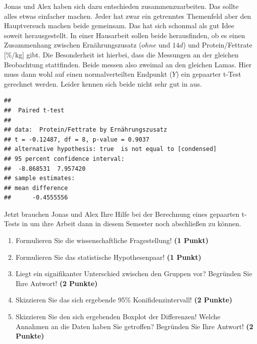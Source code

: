 \documentclass[a4paper, 9pt]{scrartcl}\usepackage[]{graphicx}\usepackage[]{xcolor}
\makeatletter
\newenvironment{kframe}{%
 \def\at@end@of@kframe{}%
 \ifinner\ifhmode%
  \def\at@end@of@kframe{\end{minipage}}%
  \begin{minipage}{\columnwidth}%
 \fi\fi%
 \def\FrameCommand##1{\hskip\@totalleftmargin \hskip-\fboxsep
 \colorbox{shadecolor}{##1}\hskip-\fboxsep
     \hskip-\linewidth \hskip-\@totalleftmargin \hskip\columnwidth}%
 \MakeFramed {\advance\hsize-\width
   \@totalleftmargin\z@ \linewidth\hsize
   \@setminipage}}%
 {\par\unskip\endMakeFramed%
 \at@end@of@kframe}
\newenvironment{knitrout}{}{} %
\makeatother
\begin{document}
Jonas und Alex haben sich dazu entschieden zusammenzuarbeiten. Das sollte alles etwas einfacher machen. Jeder hat zwar ein getrenntes Themenfeld aber den Hauptversuch machen beide gemeinsam. Das hat sich schonmal als gut Idee soweit herausgestellt. In einer Hausarbeit sollen beide herausfinden, ob es einen Zusammenhang zwischen Ernährungszusatz ($ohne$ und $14d$) und Protein/Fettrate [\%/kg] gibt. Die Besonderheit ist hierbei, dass die Messungen an der gleichen Beobachtung stattfinden. Beide messen also zweimal an den gleichen Lamas. Hier muss dann wohl auf einen normalverteilten Endpunkt ($Y$) ein gepaarter t-Test gerechnet werden. Leider kennen sich beide nicht sehr gut in \Rlogo aus.

\begin{knitrout}
\color{fgcolor}\begin{kframe}
\begin{verbatim}
## 
## 	Paired t-test
## 
## data:  Protein/Fettrate by Ernährungszusatz
## t = -0.12487, df = 8, p-value = 0.9037
## alternative hypothesis: true  is not equal to [condensed]
## 95 percent confidence interval:
##  -8.868531  7.957420
## sample estimates:
## mean difference 
##      -0.4555556
\end{verbatim}
\end{kframe}
\end{knitrout}

Jetzt brauchen Jonas und Alex Ihre Hilfe bei der Berechnung eines gepaarten t-Tests in \Rlogo um ihre Arbeit dann in diesem Semester noch abschließen zu können.

\begin{enumerate}
  \item Formulieren Sie die wissenschaftliche Fragestellung! \textbf{(1 Punkt)}
  \item Formulieren Sie das statistische Hypothesenpaar! \textbf{(1 Punkt)}
\item Liegt ein signifikanter Unterschied zwischen den Gruppen vor?
  Begründen Sie Ihre Antwort! \textbf{(2 Punkte)}
\item Skizzieren Sie das sich ergebende 95\% Konifidenzintervall! \textbf{(2 Punkte)}
\item Skizzieren Sie den sich ergebenden Boxplot der Differenzen! Welche Annahmen an die Daten haben Sie getroffen? Begründen Sie Ihre Antwort! \textbf{(2 Punkte)} 
\end{enumerate}
 
\clearpage
\end{document}

